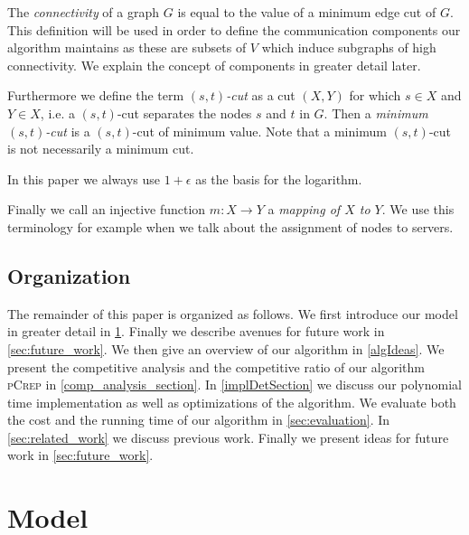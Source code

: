 \documentclass[a4paper,UKenglish,cleveref, autoref, thm-restate,authorcolumns]{lipics-v2019}
\newcommand{\adjDel}{\textsc{pCrep}}
\begin{document}
The \textit{connectivity} of a graph $G$ is equal to the value of a minimum edge cut of $G$. This definition will be used in order to define the communication components our algorithm maintains as these are subsets of $V$ which induce subgraphs of high connectivity. We explain the concept of components in greater detail later.

Furthermore we define the term $(s,t)$\textit{-cut} as a cut $(X,Y)$ for which $s\in X$ and $Y\in X$, i.e. a $(s,t)$-cut separates the nodes $s$ and $t$ in $G$. Then a \textit{minimum $(s,t)$-cut} is a $(s,t)$-cut of minimum value. Note that a minimum $(s,t)$-cut is not necessarily a minimum cut.

In this paper we always use $1+\epsilon$ as the basis for the logarithm.

Finally we call an injective function $m:X\rightarrow Y$ a \textit{mapping of $X$ to $Y$}. We use this terminology for example when we talk about the assignment of nodes to servers.

\subsection{Organization}

The remainder of this paper is organized
as follows. 
We first introduce our model in greater detail in \cref{problem_definition_section}.
Finally we describe avenues for future work in \cref{sec:future_work}. We then give an overview of our algorithm in \cref{algIdeas}.
We present the competitive analysis and the competitive ratio of our algorithm \adjDel{} in \cref{comp_analysis_section}.
In \cref{implDetSection} we discuss our polynomial time implementation as well as optimizations 
of the algorithm.
We evaluate both the cost and the running time of our algorithm in \cref{sec:evaluation}. 
In \cref{sec:related_work} we discuss previous work. Finally we present ideas for future 
work in \cref{sec:future_work}.


\section{Model}
\label{problem_definition_section}
\end{document}
